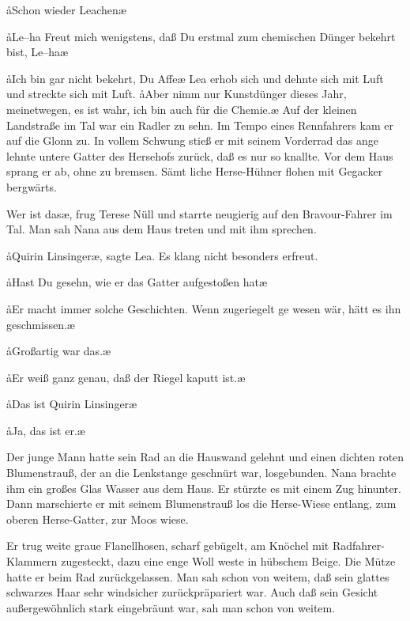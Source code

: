 \aa{}Schon wieder Leachen\ausr{}\ae{}

\aa{}Le--ha\ausr{} Freut mich wenigstens, daß Du erstmal zum
chemischen Dünger bekehrt bist, Le--ha\ausr{}\ae{}

\aa{}Ich bin gar nicht bekehrt, Du Affe\ausr{}\ae{} Lea erhob sich und
dehnte sich mit Luft und streckte sich mit Luft. \aa{}Aber nimm
nur Kunstdünger dieses Jahr, meinetwegen, es ist wahr, ich
bin auch für die Chemie.\ae{}
\abstand{}
Auf der kleinen Landstraße im Tal war ein Radler zu sehn.
Im Tempo eines Rennfahrers kam er auf die Glonn zu. In
vollem Schwung stieß er mit seinem Vorderrad das ange\-%
lehnte untere Gatter des Hersehofs zurück, daß es nur so
knallte. Vor dem Haus sprang er ab, ohne zu bremsen. Sämt\-%
liche Herse-Hühner flohen mit Gegacker bergwärts.

\aanah{}Wer ist das\ae{}, frug Terese Nüll und starrte neugierig auf den
Bravour-Fahrer im Tal. Man sah Nana aus dem Haus treten
und mit ihm sprechen.

\aa{}Quirin Linsinger\ae{}, sagte Lea. Es klang nicht besonders erfreut.

\aa{}Hast Du gesehn, wie er das Gatter aufgestoßen hat\frag{}\ae{}

\aa{}Er macht immer solche Geschichten. Wenn zugeriegelt ge\-%
wesen wär, hätt es ihn geschmissen.\ae{}

\aa{}Großartig war das.\ae{}

\aa{}Er weiß ganz genau, daß der Riegel kaputt ist.\ae{}

\aa{}Das ist Quirin Linsinger\frag{}\ae{}

\aa{}Ja, das ist er.\ae{}

Der junge Mann hatte sein Rad an die Hauswand gelehnt
und einen dichten roten Blumenstrauß, der an die Lenkstange
geschnürt war, losgebunden. Nana brachte ihm ein großes
Glas Wasser aus dem Haus. Er stürzte es mit einem Zug
hinunter. Dann marschierte er mit seinem Blumenstrauß los\dopp{}
die Herse-Wiese entlang, zum oberen Herse-Gatter, zur Moos\-%
wiese.

Er trug weite graue Flanellhosen, scharf gebügelt, am Knöchel
mit Radfahrer-Klammern zugesteckt, dazu eine enge Woll\-%
weste in hübschem Beige. Die Mütze hatte er beim Rad
zurückgelassen. Man sah schon von weitem, daß sein glattes
schwarzes Haar sehr windsicher zurückpräpariert war. Auch
daß sein Gesicht außergewöhnlich stark eingebräunt war, sah
man schon von weitem.

